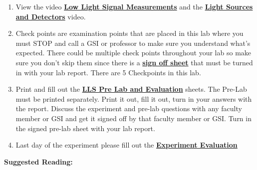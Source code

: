 \documentclass{../lab}
\begin{document}
\begin{enumerate}
    \item View the video \href{http://youtu.be/X4XQ1jcMuoI}{\textbf{Low Light Signal Measurements}} and the \href{http://youtu.be/lQKLakISoBA}{\textbf{Light Sources and Detectors}} video.

    \item Check points are examination points that are placed in this lab where you must STOP and call a GSI or professor to make sure you understand what's expected. There could  be multiple check points throughout your lab so make sure you don't skip them since there is a \href{http://experimentationlab.berkeley.edu/llscheckpoints}{\textbf{sign off sheet}} that must be turned in with your lab report. There are 5 Checkpoints in this lab.

    \item Print and fill out the \href{http://experimentationlab.berkeley.edu/LLSPreLab}{\textbf{LLS Pre Lab and Evaluation}} sheets. The Pre-Lab must be printed separately. Print it out, fill it out, turn in  your answers  with the report. Discuss the experiment and pre-lab questions with any faculty member or GSI and get it signed off by that faculty member or GSI. Turn in the signed pre-lab sheet with your lab report.

    \item Last day of the experiment please fill out the \href{\ExperimentEvaluation}{\textbf{Experiment Evaluation}}

\end{enumerate}

\noindent\textbf{Suggested Reading:}
\end{document}
